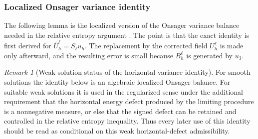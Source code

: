 \documentclass[11pt]{article}
\numberwithin{equation}{section}
\theoremstyle{plain}
\theoremstyle{definition}
\theoremstyle{remark}
\newtheorem{remark}{Remark}[section]
\begin{document}
\subsubsection{Localized Onsager variance identity}\label{pI:subsec:localized-onsager}

The following lemma is the localized version of the Onsager variance balance needed in the relative entropy argument \cite{ConstantinETiti1994}.  The point is that the exact identity is first derived for \(\bar U_h^\ell=S_\ell u_h\).  The replacement by the corrected field \(U_h^\ell\) is made only afterward, and the resulting error is small because \(B_h^\ell\) is generated by \(u_3\).

\begin{remark}[Weak-solution status of the horizontal variance identity]\label{pI:rem:horizontal-variance-status}
For smooth solutions the identity below is an algebraic localized Onsager balance.  For suitable weak solutions it is used in the regularized sense under the additional requirement that the horizontal energy defect produced by the limiting procedure is a nonnegative measure, or else that the signed defect can be retained and controlled in the relative entropy inequality.  Thus every later use of this identity should be read as conditional on this weak horizontal-defect admissibility.
\end{remark}
\end{document}
